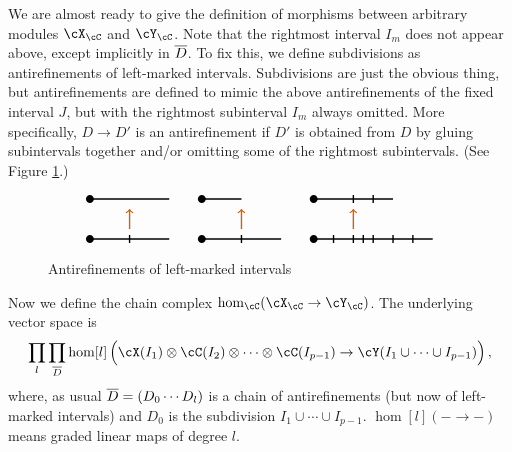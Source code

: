 We are almost ready to give the definition of morphisms between arbitrary modules
$\cX_\cC$ and $\cY_\cC$.
Note that the rightmost interval $I_m$ does not appear above, except implicitly in $\olD$.
To fix this, we define subdivisions as antirefinements of left-marked intervals.
Subdivisions are just the obvious thing, but antirefinements are defined to mimic
the above antirefinements of the fixed interval $J$, but with the rightmost subinterval $I_m$ always
omitted.
More specifically, $D\to D'$ is an antirefinement if $D'$ is obtained from $D$ by 
gluing subintervals together and/or omitting some of the rightmost subintervals.
(See Figure \ref{fig:lmar}.)
\begin{figure}[t]$$
\definecolor{arcolor}{rgb}{.75,.4,.1}
\begin{tikzpicture}[line width=1pt]
\fill (0,0) circle (.1);
\draw (0,0) -- (2,0);
\draw (1,0.1) -- (1,-0.1);

\draw [->, arcolor] (1,0.25) -- (1,0.75);

\fill (0,1) circle (.1);
\draw (0,1) -- (2,1);
\end{tikzpicture}
\qquad
\begin{tikzpicture}[line width=1pt]
\fill (0,0) circle (.1);
\draw (0,0) -- (2,0);
\draw (1,0.1) -- (1,-0.1);

\draw [->, arcolor] (1,0.25) -- (1,0.75);

\fill (0,1) circle (.1);
\draw (0,1) -- (1,1);
\end{tikzpicture}
\qquad
\begin{tikzpicture}[line width=1pt]
\fill (0,0) circle (.1);
\draw (0,0) -- (3,0);
\foreach \x in {0.5, 1.0, 1.25, 1.5, 2.0, 2.5} {
	\draw (\x,0.1) -- (\x,-0.1);
}

\draw [->, arcolor] (1,0.25) -- (1,0.75);

\fill (0,1) circle (.1);
\draw (0,1) -- (2,1);
\foreach \x in {1.0, 1.5} {
	\draw (\x,1.1) -- (\x,0.9);
}

\end{tikzpicture}
$$
\caption{Antirefinements of left-marked intervals}\label{fig:lmar}\end{figure}

Now we define the chain complex $\hom_\cC(\cX_\cC \to \cY_\cC)$.
The underlying vector space is 
\[
	\prod_l \prod_{\olD} \hom[l]\left(
				\cX(I_1)\ot\cC(I_2)\ot\cdots\ot\cC(I_{p-1}) \to 
							\cY(I_1\cup\cdots\cup I_{p-1}) \rule{0pt}{1.1em}\right) ,
\]
where, as usual ${\overline D} = (D_0\cdots D_l)$ is a chain of antirefinements
(but now of left-marked intervals) and $D_0$ is the subdivision $I_1\cup\cdots\cup I_{p-1}$.
$\hom[l](- \to -)$ means graded linear maps of degree $l$.

